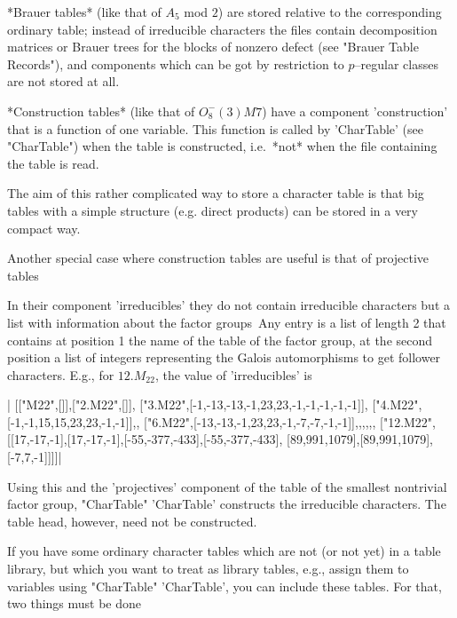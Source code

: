 *Brauer tables* (like that  of $A_5$ mod $2$) are  stored relative to the
corresponding ordinary table; instead of irreducible characters the files
contain decomposition matrices or Brauer  trees for the blocks of nonzero
defect  (see "Brauer Table Records"), and  components which can be got by
restriction to $p$--regular classes are not stored at all.

*Construction   tables*  (like that   of   $O_8^-(3)M7$) have a component
'construction'  that is a  function  of one  variable.   This function is
called by 'CharTable'  (see "CharTable") when  the table is  constructed,
i.e.\ *not* when the file containing the table is read.

The aim of this rather complicated way to store a character table is that
big  tables with a simple structure  (e.g. direct products) can be stored
in a very compact way.

Another  special case where  construction  tables are useful  is  that of
projective tables\:

In  their   component 'irreducibles'  they   do  not  contain irreducible
characters  but a list with   information about the factor groups\:\  Any
entry is a list of length 2 that  contains at position 1  the name of the
table  of the factor group, at  the  second position  a  list of integers
representing the Galois automorphisms to get  follower characters.  E.g.,
for $12.M_{22}$, the value of 'irreducibles' is

|    [["M22",[]],["2.M22",[]],
     ["3.M22",[-1,-13,-13,-1,23,23,-1,-1,-1,-1,-1]],
     ["4.M22",[-1,-1,15,15,23,23,-1,-1]],,
     ["6.M22",[-13,-13,-1,23,23,-1,-7,-7,-1,-1]],,,,,,
     ["12.M22",[[17,-17,-1],[17,-17,-1],[-55,-377,-433],[-55,-377,-433],
     [89,991,1079],[89,991,1079],[-7,7,-1]]]]|

Using this and the  'projectives' component of the  table of the smallest
nontrivial  factor  group,     "CharTable"  'CharTable'  constructs   the
irreducible  characters.     The  table  head,  however,   need    not be
constructed.

%
%

If you have some ordinary character tables which are  not (or not yet) in
a {\GAP}  table library, but  which you want  to treat as library tables,
e.g., assign  them  to variables  using "CharTable" 'CharTable',  you can
include these tables.  For that, two things must be done\:

